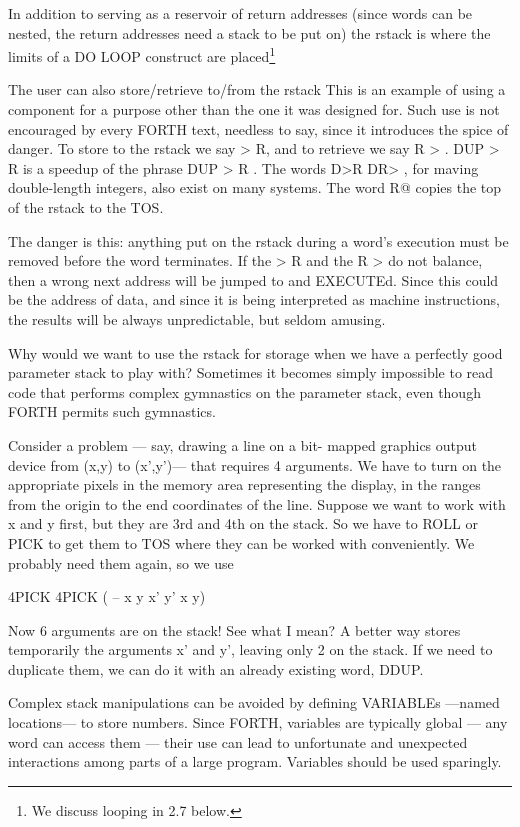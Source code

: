 In addition to serving as a reservoir of return addresses (since words can be nested, the return addresses need a stack to be put on) the rstack is where the limits of a DO LOOP construct are placed\footnote{We discuss looping in 2.7 below.}

The user can also store/retrieve to/from the rstack This is an example of using a component for a purpose other than the one it was designed for. Such use is not encouraged by every FORTH text, needless to say, since it introduces the spice of danger. To store to the rstack we say > R, and to retrieve we say R > . DUP > R is a speedup of the phrase DUP > R . The words D>R DR> , for maving double-length integers, also exist on many systems. The word R@ copies the top of the rstack to the TOS.

The danger is this: anything put on the rstack during a word’s execution must be removed before the word terminates. If the > R and the R > do not balance, then a wrong next address will be jumped to and EXECUTEd. Since this could be the address of data, and since it is being interpreted as machine instructions, the results will be always unpredictable, but seldom amusing.

Why would we want to use the rstack for storage when we have a perfectly good parameter stack to play with? Sometimes it becomes simply impossible to read code that performs complex gymnastics on the parameter stack, even though FORTH permits such gymnastics.

Consider a problem — say, drawing a line on a bit- mapped graphics output device from (x,y) to (x’,y’)— that requires 4 arguments. We have to turn on the appropriate pixels in the memory area representing the display, in the ranges from the origin to the end coordinates of the line. Suppose we want to work with x and y first, but they are 3rd and 4th on the stack. So we have to ROLL or PICK to get them to TOS where they can be worked with conveniently. We probably need them again, so we use

4PICK 4PICK ( -- x y x' y' x y)

Now 6 arguments are on the stack! See what I mean? A better way stores temporarily the arguments x’ and y', leaving only 2 on the stack. If we need to duplicate them, we can do it with an already existing word, DDUP.

Complex stack manipulations can be avoided by defining VARIABLEs —named locations— to store numbers. Since FORTH, variables are typically global — any word can access them — their use can lead to unfortunate and unexpected interactions among parts of a large program. Variables should be used sparingly.

